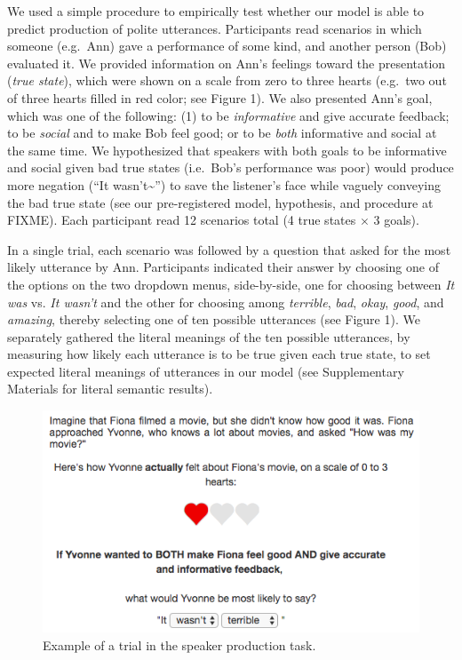 \documentclass[12pt]{article}
\begin{document}
We used a simple procedure to empirically test whether our model is able
to predict production of polite utterances. Participants read scenarios
in which someone (e.g.~Ann) gave a performance of some kind, and another
person (Bob) evaluated it. We provided information on Ann's feelings
toward the presentation (\emph{true state}), which were shown on a scale
from zero to three hearts (e.g.~two out of three hearts filled in red
color; see Figure 1). We also presented Ann's goal, which was one of the
following: (1) to be \emph{informative} and give accurate feedback; to
be \emph{social} and to make Bob feel good; or to be \emph{both}
informative and social at the same time. We hypothesized that speakers
with both goals to be informative and social given bad true states
(i.e.~Bob's performance was poor) would produce more negation
(\enquote{It wasn't\textasciitilde{}}) to save the listener's face while
vaguely conveying the bad true state (see our pre-registered model,
hypothesis, and procedure at FIXME). Each participant read 12 scenarios
total (4 true states \(\times\) 3 goals).

In a single trial, each scenario was followed by a question that asked
for the most likely utterance by Ann. Participants indicated their
answer by choosing one of the options on the two dropdown menus,
side-by-side, one for choosing between \emph{It was} vs. \emph{It
wasn't} and the other for choosing among \emph{terrible}, \emph{bad},
\emph{okay}, \emph{good}, and \emph{amazing}, thereby selecting one of
ten possible utterances (see Figure 1). We separately gathered the
literal meanings of the ten possible utterances, by measuring how likely
each utterance is to be true given each true state, to set expected
literal meanings of utterances in our model (see Supplementary Materials
for literal semantic results).

\begin{figure}
\centering
\includegraphics{fig/screenshot.png}
\caption{Example of a trial in the speaker production task.}
\end{figure}
\end{document}
